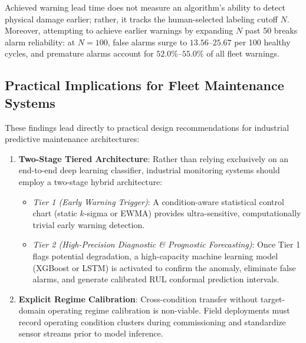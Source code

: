 Achieved warning lead time does not measure an algorithm's ability to detect physical damage earlier; rather, it tracks the human-selected labeling cutoff $N$. 
Moreover, attempting to achieve earlier warnings by expanding $N$ past 50 breaks alarm reliability: at $N=100$, false alarms surge to $13.56$--$25.67$ per 100 healthy cycles, and premature alarms account for $52.0\%$--$55.0\%$ of all fleet warnings.

\subsection{Practical Implications for Fleet Maintenance Systems}
These findings lead directly to practical design recommendations for industrial predictive maintenance architectures:
\begin{enumerate}
    \item \textbf{Two-Stage Tiered Architecture}: Rather than relying exclusively on an end-to-end deep learning classifier, industrial monitoring systems should employ a two-stage hybrid architecture:
    \begin{itemize}
        \item \emph{Tier 1 (Early Warning Trigger)}: A condition-aware statistical control chart (static $k$-sigma or EWMA) provides ultra-sensitive, computationally trivial early warning detection.
        \item \emph{Tier 2 (High-Precision Diagnostic \& Prognostic Forecasting)}: Once Tier 1 flags potential degradation, a high-capacity machine learning model (XGBoost or LSTM) is activated to confirm the anomaly, eliminate false alarms, and generate calibrated RUL conformal prediction intervals.
    \end{itemize}
    \item \textbf{Explicit Regime Calibration}: Cross-condition transfer without target-domain operating regime calibration is non-viable. Field deployments must record operating condition clusters during commissioning and standardize sensor streams prior to model inference.
\end{enumerate}
